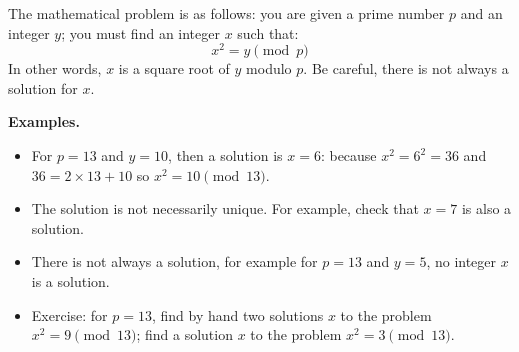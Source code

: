 \documentclass[11pt,class=report,crop=false]{standalone}
\begin{document}





\begin{activite}



The mathematical problem is as follows: you are given a prime number $p$ and an integer $y$; you must find an integer $x$ such that:
$$x^2 = y \pmod{p}$$
In other words, $x$ is a square root of $y$ modulo $p$.
Be careful, there is not always a solution for $x$. 

\textbf{Examples.}
\begin{itemize}
  \item For $p=13$ and $y = 10$, then a solution is $x = 6$: because $x^2 = 6^2 = 36$ and $36 = 2\times 13 + 10$ so $x^2 = 10 \pmod{13}$.
  
  \item The solution is not necessarily unique. For example, check that $x=7$ is also a solution.
  
  \item There is not always a solution, for example for $p=13$ and $y=5$, no integer $x$ is a solution.
  
  \item Exercise: for $p = 13$, find by hand two solutions $x$ to the problem $x^2 = 9 \pmod{13}$; find a solution $x$ to the problem $x^2 = 3 \pmod{13}$.
  
\end{itemize}



\end{activite}
\end{document}
